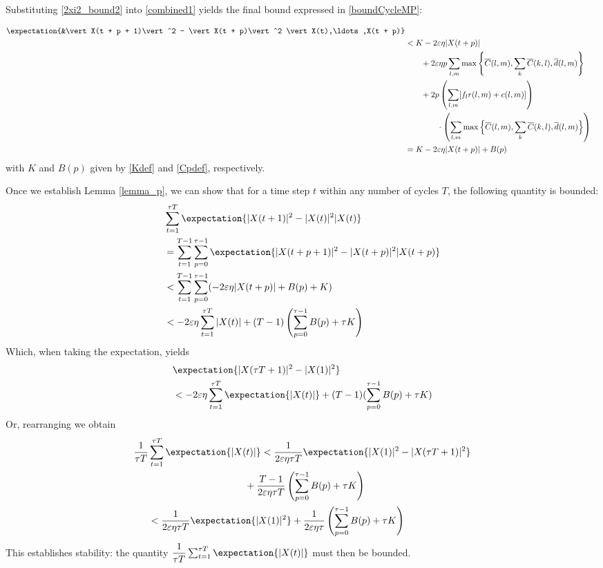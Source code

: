Substituting \eqref{2xi2_bound2} into \eqref{combined1} yields the final bound expressed in
 \eqref{boundCycleMP}:

\begin{align} \nonumber
\expectation{&\vert X(t + p +  1)\vert^2 - \vert  X(t + p)\vert^2 \vert X(t),\ldots,X(t + p)}  \\ \nonumber
&<  K  -2 \varepsilon \eta \vert X(t + p) \vert \\ \nonumber
&\qquad + 2\varepsilon \eta p \sum_{l,m} \max\left\{ \overline{C}(l,m),\sum_{k}\overline{C}(k,l),\overline d(l,m) \right\}  \\ \nonumber
&  \qquad  + 2 p \left(\sum_{l,m}[f_{l}r(l,m) + c(l,m)]\right) \\ \nonumber
& \qquad \qquad \cdot \left( \sum_{l,m} \max\Big\{  \overline{C}(l,m), \sum_{k}\overline{C}(k,l), \overline{d}(l,m)\Big\} \right) \\
&= K  -2 \varepsilon \eta \vert X(t + p) \vert + B(p)
\end{align}
with $K$ and $B(p)$ given by \eqref{Kdef} and \eqref{Cpdef}, respectively. 



Once we establish Lemma \ref{lemma_p}, we can show that for a time step $t$ within any number of cycles $T$, the following quantity is bounded:
\begin{align} \nonumber 
&\sum_{t = 1}^{\tau T} \expectation{\vert X(t + 1)\vert^2 - \vert X(t)\vert^2 \vert X(t)}\\ \nonumber
&=\sum_{t=1}^{T-1} \sum_{p=0 }^{\tau - 1} \expectation{\vert X(t + p + 1)\vert^2 - \vert X(t + p)\vert^2 \vert X(t + p)}\\ \nonumber
&< \sum_{t=1}^{T-1} \sum_{p=0 }^{\tau - 1} (-2\varepsilon\eta \vert X(t + p )\vert + B(p) + K ) \\
&< -2\varepsilon \eta \sum_{t=1}^{\tau T} \vert X(t )\vert  + (T - 1) \left(\sum_{p=0 }^{\tau - 1} B(p) + \tau K\right) \label{equivalencestabcycleMP}
\end{align}
Which, when taking the expectation, yields
\begin{align} \nonumber 
& \expectation{\vert X(\tau T + 1)\vert^2 - \vert X(1)\vert^2 } \\
& <  -2\varepsilon\eta \sum_{t=1}^{\tau T} \expectation{\vert X(t )\vert}+ (T - 1) ( \sum_{p=0 }^{\tau - 1} B(p) + \tau K)
\end{align}
Or, rearranging we obtain
\begin{align} \nonumber 
\dfrac{1}{\tau T}& \sum_{t=1}^{\tau T}  \expectation{\vert X(t )\vert} < \dfrac{1}{2\varepsilon\eta\tau T}\expectation{\vert X(1)\vert^2 - \vert X(\tau T + 1)\vert^2  }\\ \nonumber 
&\qquad \qquad \qquad \qquad \qquad + \dfrac{ T -1}{2\varepsilon\eta\tau T} \left(\sum_{p=0 }^{\tau - 1} B(p) + \tau K\right) \\
&< \dfrac{1}{2\varepsilon\eta\tau T}\expectation{\vert X( 1)\vert^2}
+ \dfrac{ 1}{2\varepsilon\eta\tau } \left(\sum_{p=0 }^{\tau - 1} B(p) + \tau K\right)
\end{align}
This establishes stability: the quantity $\dfrac{1}{\tau T}\sum_{t=1}^{\tau T} \expectation{\vert X(t )\vert}$ must then be bounded.\\ 


